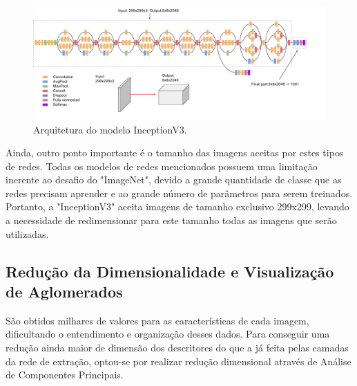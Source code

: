 \documentclass[12pt]{report}
\newcommand*{\captionsource}[2]{%
  \caption[{#1}]{%
    #1%
    \\\hspace{\linewidth}%
     \text{Fonte:}#2%
  }%
}
\begin{document}

\begin{figure}
    \centering
    \includegraphics[scale=0.5]{images/inceptionv3.png}
    \captionsource{Arquitetura do modelo InceptionV3.}{ \protect\cite{inceptionarch}}
    \label{fig:inceptionv3}
\end{figure}


Ainda, outro ponto importante é o tamanho das imagens aceitas por estes tipos de redes. Todas os modelos de redes mencionados possuem uma limitação inerente ao desafio do "ImageNet", devido a grande quantidade de classe que as redes precisam aprender e ao grande número de parâmetros para serem treinados. Portanto, a "InceptionV3"  aceita imagens de tamanho exclusivo 299x299, levando a necessidade de redimensionar para este tamanho todas as imagens que serão utilizadas.

\subsection{Redução da Dimensionalidade e Visualização de Aglomerados}

São obtidos milhares de valores para as características de cada imagem, dificultando o entendimento e organização desses dados. Para conseguir uma redução ainda maior de dimensão dos descritores do que a já feita pelas camadas da rede de extração, optou-se por realizar redução dimensional através de Análise de Componentes Principais.
\end{document}

